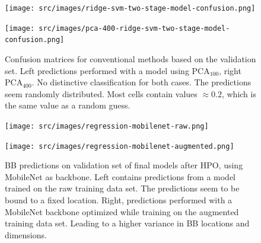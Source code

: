 \begin{figure}
    \centering
    \begin{minipage}{.45\textwidth}
    \texttt{[image: src/images/ridge-svm-two-stage-model-confusion.png]}
    \end{minipage}
    \hfill
    \begin{minipage}{.45\textwidth}
    \texttt{[image: src/images/pca-400-ridge-svm-two-stage-model-confusion.png]}
    \end{minipage}
    \caption{Confusion matrices for conventional methods based on the validation set. Left predictions performed with a model using $\text{PCA}_{100}$, right $\text{PCA}_{400}$. No distinctive classification for both cases. The predictions seem randomly distributed. Most cells contain values $\approx0.2$, which is the same value as a random guess.}
    \label{fig:conventional-confusions}
\end{figure}

\begin{figure}[!ht]
    \centering
    \begin{minipage}{.45\textwidth}
    \texttt{[image: src/images/regression-mobilenet-raw.png]}
    \end{minipage}
    \hfill
    \begin{minipage}{.45\textwidth}
    \texttt{[image: src/images/regression-mobilenet-augmented.png]}
    \end{minipage}
    \caption{BB predictions on validation set of final models after HPO, using MobileNet as backbone. Left contains predictions from a model trained on the raw training data set. The predictions seem to be bound to a fixed location. Right, predictions performed with a MobileNet backbone optimized while training on the augmented training data set. Leading to a higher variance in BB locations and dimensions.}
    \label{fig:regression-samples-mobilenet}
\end{figure}

